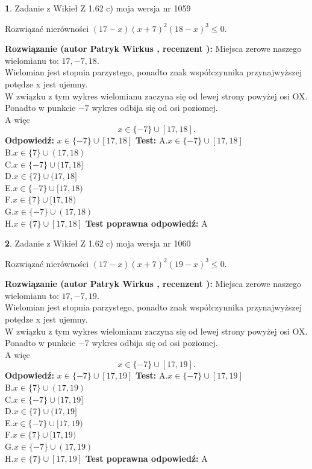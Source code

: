 \documentclass[12pt, a4paper]{article}
\theoremstyle{definition} %
\newtheorem{zad}{}
\newcommand{\zadStart}[1]{\begin{zad}#1\newline}
\newcommand{\zadStop}{\end{zad}}
\newcommand{\rozwStart}[2]{\noindent \textbf{Rozwiązanie (autor #1 , recenzent #2): }\newline}
\newcommand{\rozwStop}{\newline}
\newcommand{\odpStart}{\noindent \textbf{Odpowiedź:}\newline}
\newcommand{\odpStop}{\newline}
\newcommand{\testStart}{\noindent \textbf{Test:}\newline}
\newcommand{\testStop}{\newline}
\newcommand{\kluczStart}{\noindent \textbf{Test poprawna odpowiedź:}\newline}
\newcommand{\kluczStop}{\newline}
\begin{document}
\zadStart{Zadanie z Wikieł Z 1.62 c) moja wersja nr 1059}

Rozwiązać nierówności $(17-x)(x+7)^{2}(18-x)^{3}\le0$.
\zadStop
\rozwStart{Patryk Wirkus}{}
Miejsca zerowe naszego wielomianu to: $17, -7, 18$.\\
Wielomian jest stopnia parzystego, ponadto znak współczynnika przy\linebreak najwyższej potędze x jest ujemny.\\ W związku z tym wykres wielomianu zaczyna się od lewej strony powyżej osi OX.\\
Ponadto w punkcie $-7$ wykres odbija się od osi poziomej.\\
A więc $$x \in \{-7\} \cup [17,18].$$
\rozwStop
\odpStart
$x \in \{-7\} \cup [17,18]$
\odpStop
\testStart
A.$x \in \{-7\} \cup [17,18]$\\
B.$x \in \{7\} \cup (17,18)$\\
C.$x \in \{-7\} \cup (17,18]$\\
D.$x \in \{7\} \cup (17,18]$\\
E.$x \in \{-7\} \cup [17,18)$\\
F.$x \in \{7\} \cup [17,18)$\\
G.$x \in \{-7\} \cup (17,18)$\\
H.$x \in \{7\} \cup [17,18]$
\testStop
\kluczStart
A
\kluczStop



\zadStart{Zadanie z Wikieł Z 1.62 c) moja wersja nr 1060}

Rozwiązać nierówności $(17-x)(x+7)^{2}(19-x)^{3}\le0$.
\zadStop
\rozwStart{Patryk Wirkus}{}
Miejsca zerowe naszego wielomianu to: $17, -7, 19$.\\
Wielomian jest stopnia parzystego, ponadto znak współczynnika przy\linebreak najwyższej potędze x jest ujemny.\\ W związku z tym wykres wielomianu zaczyna się od lewej strony powyżej osi OX.\\
Ponadto w punkcie $-7$ wykres odbija się od osi poziomej.\\
A więc $$x \in \{-7\} \cup [17,19].$$
\rozwStop
\odpStart
$x \in \{-7\} \cup [17,19]$
\odpStop
\testStart
A.$x \in \{-7\} \cup [17,19]$\\
B.$x \in \{7\} \cup (17,19)$\\
C.$x \in \{-7\} \cup (17,19]$\\
D.$x \in \{7\} \cup (17,19]$\\
E.$x \in \{-7\} \cup [17,19)$\\
F.$x \in \{7\} \cup [17,19)$\\
G.$x \in \{-7\} \cup (17,19)$\\
H.$x \in \{7\} \cup [17,19]$
\testStop
\kluczStart
A
\kluczStop
\end{document}

